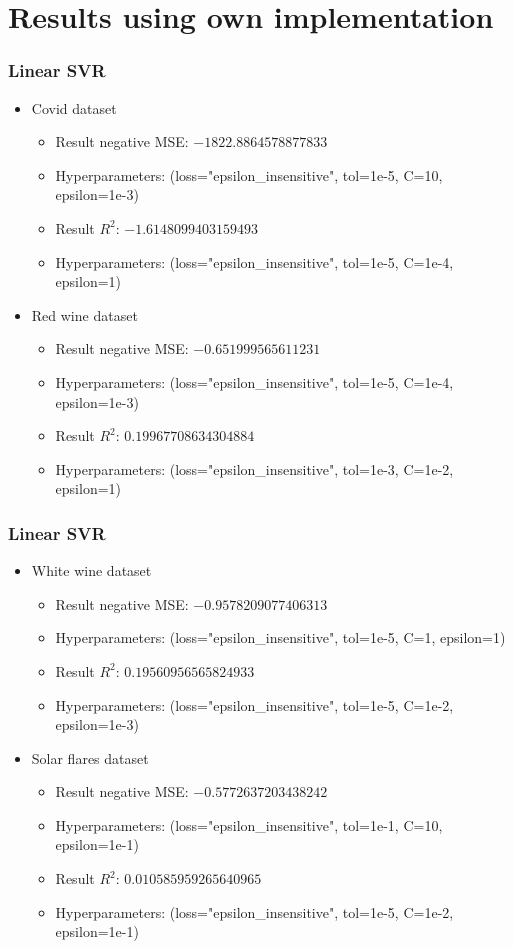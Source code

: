 \documentclass{beamer}
\begin{document}
\section{Results using own implementation}
\frame
{
  \frametitle{Linear SVR}

  \begin{itemize}
    \item Covid dataset
    \begin{itemize}
      \item Result negative MSE: $-1822.8864578877833$
      \item Hyperparameters: (loss="epsilon\_insensitive", tol=1e-5, C=10, epsilon=1e-3)
      \item Result $R^{2}$: $-1.6148099403159493$
      \item Hyperparameters: (loss="epsilon\_insensitive", tol=1e-5, C=1e-4, epsilon=1)
    \end{itemize}
    \item Red wine dataset
    \begin{itemize}
      \item Result negative MSE: $-0.651999565611231$
      \item Hyperparameters: (loss="epsilon\_insensitive", tol=1e-5, C=1e-4, epsilon=1e-3)
      \item Result $R^{2}$: $0.19967708634304884$
      \item Hyperparameters: (loss="epsilon\_insensitive", tol=1e-3, C=1e-2, epsilon=1)
    \end{itemize}
  \end{itemize}
}

\frame
{
  \frametitle{Linear SVR}

  \begin{itemize}
    \item White wine dataset
    \begin{itemize}
      \item Result negative MSE: $-0.9578209077406313$
      \item Hyperparameters: (loss="epsilon\_insensitive", tol=1e-5, C=1, epsilon=1)
      \item Result $R^{2}$: $0.19560956565824933$
      \item Hyperparameters: (loss="epsilon\_insensitive", tol=1e-5, C=1e-2, epsilon=1e-3)
    \end{itemize}
    \item Solar flares dataset
    \begin{itemize}
      \item Result negative MSE: $-0.5772637203438242$
      \item Hyperparameters: (loss="epsilon\_insensitive", tol=1e-1, C=10, epsilon=1e-1)
      \item Result $R^{2}$: $0.010585959265640965$
      \item Hyperparameters: (loss="epsilon\_insensitive", tol=1e-5, C=1e-2, epsilon=1e-1)
    \end{itemize}
  \end{itemize}
}
\end{document}

